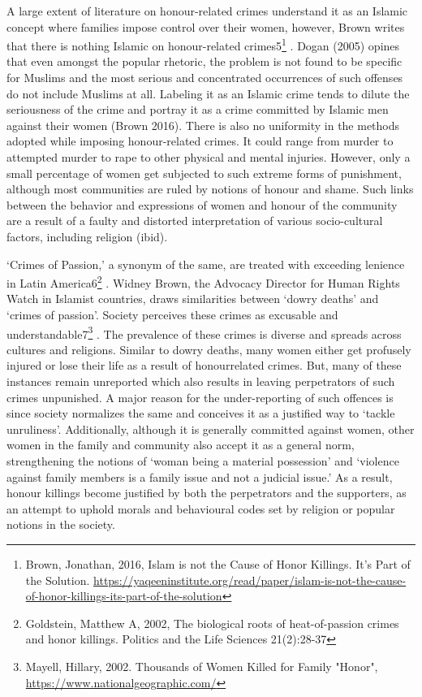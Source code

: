 \begin{multicols}{2}
\noi
A large extent of literature on honour-related crimes understand it as an Islamic concept
where families impose control over their women, however, Brown writes that there is
nothing Islamic on honour-related crimes5\footnote{Brown, Jonathan, 2016, Islam is not the Cause of Honor Killings. It’s Part of the Solution.
\url{https://yaqeeninstitute.org/read/paper/islam-is-not-the-cause-of-honor-killings-its-part-of-the-solution}}
. Dogan (2005) opines that even amongst the
popular rhetoric, the problem is not found to be specific for Muslims and the most
serious and concentrated occurrences of such offenses do not include Muslims at all.
Labeling it as an Islamic crime tends to dilute the seriousness of the crime and portray
it as a crime committed by Islamic men against their women (Brown 2016). There is
also no uniformity in the methods adopted while imposing honour-related crimes. It
could range from murder to attempted murder to rape to other physical and mental
injuries. However, only a small percentage of women get subjected to such extreme
forms of punishment, although most communities are ruled by notions of honour and
shame. Such links between the behavior and expressions of women and honour of the
community are a result of a faulty and distorted interpretation of various socio-cultural
factors, including religion (ibid). 

\noi
‘Crimes of Passion,’ a synonym of the same, are treated with exceeding lenience in
Latin America6\footnote{ Goldstein, Matthew A, 2002, The biological roots of heat-of-passion crimes and honor killings. Politics
and the Life Sciences 21(2):28-37}
. Widney Brown, the Advocacy Director for Human Rights Watch in
Islamist countries, draws similarities between ‘dowry deaths’ and ‘crimes of passion’.
Society perceives these crimes as excusable and understandable7\footnote{Mayell, Hillary, 2002. Thousands of Women Killed for Family "Honor",
\url{https://www.nationalgeographic.com/}}
. The prevalence of
these crimes is diverse and spreads across cultures and religions. Similar to dowry
deaths, many women either get profusely injured or lose their life as a result of honourrelated crimes. But, many of these instances remain unreported which also results in
leaving perpetrators of such crimes unpunished. A major reason for the under-reporting
of such offences is since society normalizes the same and conceives it as a justified way
to ‘tackle unruliness’. Additionally, although it is generally committed against women,
other women in the family and community also accept it as a general norm,
strengthening the notions of ‘woman being a material possession’ and ‘violence against
family members is a family issue and not a judicial issue.’ As a result, honour killings become justified by both the perpetrators and the supporters, as an attempt to uphold
morals and behavioural codes set by religion or popular notions in the society.


\end{multicols}
